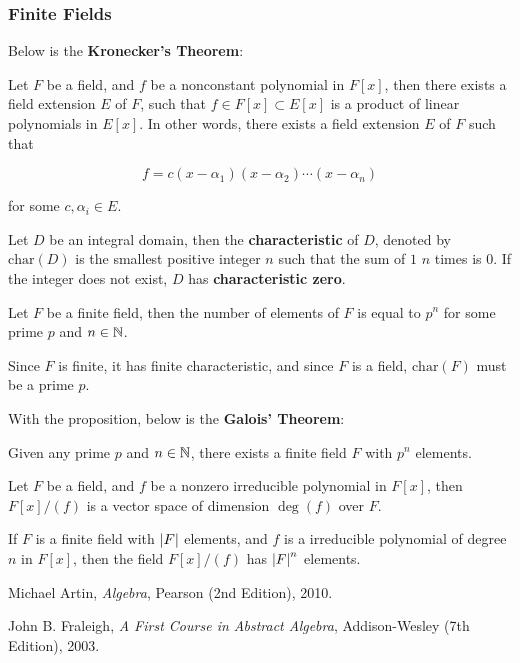 \documentclass[a4paper,12pt]{article}
\begin{document}
\subsubsection{Finite Fields}
Below is the \textbf{Kronecker's Theorem}:\n

\begin{thm}
  Let $F$ be a field, and $f$ be a nonconstant polynomial in $F[x]$, then there exists a field extension $E$ of $F$, such that $f\in F[x]\subset E[x]$ is a product of linear polynomials in $E[x]$. In other words, there exists a field extension $E$ of $F$ such that
  
  $$f=c(x-\alpha_{1})(x-\alpha_{2})\cdots(x-\alpha_{n})$$\s

  for some $c,\alpha_{i}\in E$.
\end{thm}\n

\begin{dft}
  Let $D$ be an integral domain, then the \textbf{characteristic} of $D$, denoted by $\mathrm{char}(D)$ is the smallest positive integer $n$ such that
  the sum of $1$ $n$ times is $0$. If the integer does not exist, $D$ has \textbf{characteristic zero}.
\end{dft}\n

\begin{pst}
  Let $F$ be a finite field, then the number of elements of $F$ is equal to $p^{n}$ for some prime $p$ and $n\in\mathbb{N}$.\n

  \prf Since $F$ is finite, it has finite characteristic, and since $F$ is a field, $\mathrm{char}(F)$ must be a prime $p$.
\end{pst}\n

With the proposition, below is the \textbf{Galois' Theorem}:\n

\begin{thm}
  Given any prime $p$ and $n\in\mathbb{N}$, there exists a finite field $F$ with $p^{n}$ elements.
\end{thm}\n

\begin{pst}
  Let $F$ be a field, and $f$ be a nonzero irreducible polynomial in $F[x]$, then $F[x]/(f)$ is a vector space of dimension $\deg(f)$ over $F$.
\end{pst}\n

\begin{crl}
  If $F$ is a finite field with $\left| F\right|$ elements, and $f$ is a irreducible polynomial of degree $n$ in $F[x]$, then the field $F[x]/(f)$ has $\left| F\right|^{n}$ elements.
\end{crl}



\begin{alist}
  \item Michael Artin, \textit{Algebra}, Pearson (2nd Edition), 2010.
  \item John B. Fraleigh, \textit{A First Course in Abstract Algebra}, Addison-Wesley (7th Edition), 2003.
\end{alist}
\end{document}

